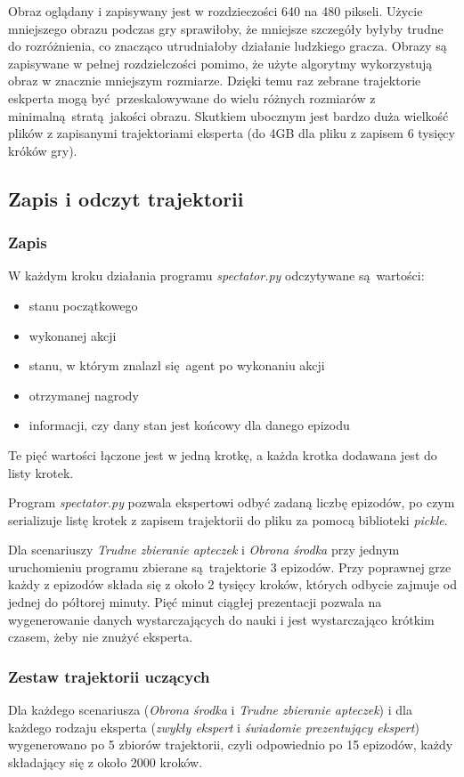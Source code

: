Obraz oglądany i zapisywany jest w rozdzieczości 640 na 480 pikseli. Użycie mniejszego obrazu podczas gry sprawiłoby, że mniejsze szczegóły byłyby trudne do rozróżnienia, co znacząco utrudniałoby działanie ludzkiego gracza. Obrazy są zapisywane w pełnej rozdzielczości pomimo, że użyte algorytmy wykorzystują obraz w znacznie mniejszym rozmiarze. Dzięki temu raz zebrane trajektorie eskperta mogą być przeskalowywane do wielu różnych rozmiarów z minimalną stratą jakości obrazu. Skutkiem ubocznym jest bardzo duża wielkość plików z zapisanymi trajektoriami eksperta (do 4GB dla pliku z zapisem 6 tysięcy króków gry).

\subsection{Zapis i odczyt trajektorii}
\subsubsection{Zapis}
W każdym kroku działania programu \textit{spectator.py} odczytywane są wartości:

\begin{itemize}
\item{stanu początkowego}
\item{wykonanej akcji}
\item{stanu, w którym znalazł się agent po wykonaniu akcji}
\item{otrzymanej nagrody}
\item{informacji, czy dany stan jest końcowy dla danego epizodu}
\end{itemize}

Te pięć wartości łączone jest w jedną krotkę, a każda krotka dodawana jest do listy krotek.

Program \textit{spectator.py} pozwala ekspertowi odbyć zadaną liczbę epizodów, po czym serializuje listę krotek z zapisem trajektorii do pliku za pomocą biblioteki \textit{pickle}.

Dla scenariuszy \textit{Trudne zbieranie apteczek} i \textit{Obrona środka} przy jednym uruchomieniu programu zbierane są trajektorie 3 epizodów. Przy poprawnej grze każdy z epizodów składa się z około 2 tysięcy kroków, których odbycie zajmuje od jednej do półtorej minuty. Pięć minut ciągłej prezentacji pozwala na wygenerowanie danych wystarczających do nauki i jest wystarczająco krótkim czasem, żeby nie znużyć eksperta.

\subsubsection{Zestaw trajektorii uczących}
Dla każdego scenariusza (\textit{Obrona środka} i \textit{Trudne zbieranie apteczek}) i dla każdego rodzaju eksperta (\textit{zwykły ekspert} i \textit{świadomie prezentujący ekspert}) wygenerowano po 5 zbiorów trajektorii, czyli odpowiednio po 15 epizodów, każdy składający się z około 2000 kroków.

